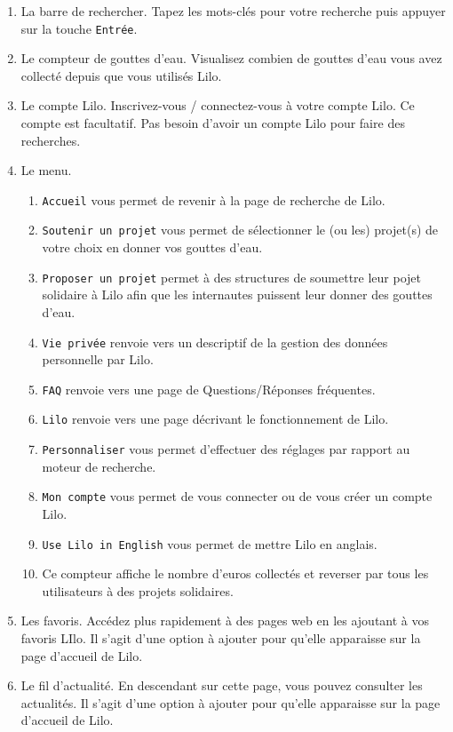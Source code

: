 \documentclass[12pt]{book}
\begin{document}
	\begin{enumerate}
		\item La barre de rechercher.
				Tapez les mots-clés pour votre recherche puis appuyer sur la touche \texttt{Entrée}.
		\item Le compteur de gouttes d'eau.
				Visualisez combien de gouttes d'eau vous avez collecté depuis que vous utilisés Lilo.
		\item Le compte Lilo.
				Inscrivez-vous / connectez-vous à votre compte Lilo.
				Ce compte est facultatif.
				Pas besoin d'avoir un compte Lilo pour faire des recherches.
		\item Le menu.
		\begin{enumerate}
			\item \texttt{Accueil} vous permet de revenir à la page de recherche de Lilo.
			\item \texttt{Soutenir un projet} vous permet de sélectionner le (ou les) projet(s) de votre choix en donner vos gouttes d'eau.
			\item \texttt{Proposer un projet} permet à des structures de soumettre leur pojet solidaire à Lilo afin que les internautes puissent leur donner des gouttes d'eau.
			\item \texttt{Vie privée} renvoie vers un descriptif de la gestion des données personnelle par Lilo.
			\item \texttt{FAQ} renvoie vers une page de Questions/Réponses fréquentes.
			\item \texttt{Lilo} renvoie vers une page décrivant le fonctionnement de Lilo.
			\item \texttt{Personnaliser} vous permet d'effectuer des réglages par rapport au moteur de recherche.
			\item \texttt{Mon compte} vous permet de vous connecter ou de vous créer un compte Lilo.
			\item \texttt{Use Lilo in English} vous permet de mettre Lilo en anglais.
			\item Ce compteur affiche le nombre d'euros collectés et reverser par tous les utilisateurs à des projets solidaires.
		\end{enumerate}
		\item Les favoris.
				Accédez plus rapidement à des pages web en les ajoutant à vos favoris LIlo.
				Il s'agit d'une option à ajouter pour qu'elle apparaisse sur la page d'accueil de Lilo.
		\item Le fil d'actualité.
				En descendant sur cette page, vous pouvez consulter les actualités.
				Il s'agit d'une option à ajouter pour qu'elle apparaisse sur la page d'accueil de Lilo.
	\end{enumerate}
\end{document}

